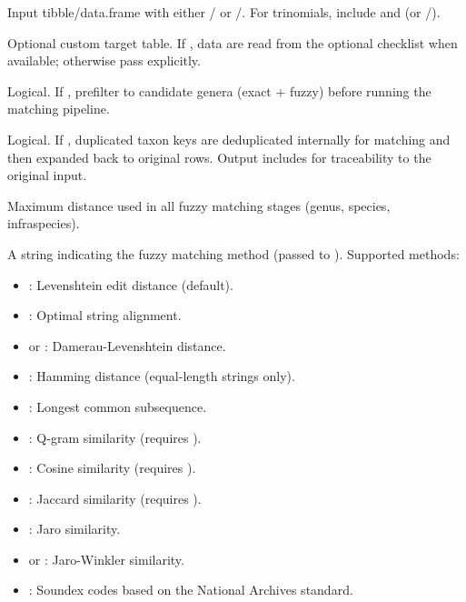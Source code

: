 \documentclass[a4paper]{book}
\begin{document}
%
\begin{Arguments}
\begin{ldescription}
\item[\code{df}] Input tibble/data.frame with either / or
/. For trinomials, include  and
 (or /).

\item[\code{target\_df}] Optional custom target table. If , data are read from
the optional  checklist when available; otherwise pass  explicitly.

\item[\code{prefilter\_genus}] Logical. If , prefilter  to candidate
genera (exact + fuzzy) before running the matching pipeline.

\item[\code{allow\_duplicates}] Logical. If , duplicated taxon keys are
deduplicated internally for matching and then expanded back to original
rows. Output includes  for traceability to the original input.

\item[\code{max\_dist}] Maximum distance used in all fuzzy matching stages (genus, species, infraspecies).

\item[\code{method}] A string indicating the fuzzy matching method (passed to ). Supported methods:
\begin{itemize}

\item{} : Levenshtein edit distance (default).
\item{} : Optimal string alignment.
\item{}  or : Damerau-Levenshtein distance.
\item{} : Hamming distance (equal-length strings only).
\item{} : Longest common subsequence.
\item{} : Q-gram similarity (requires ).
\item{} : Cosine similarity (requires ).
\item{} : Jaccard similarity (requires ).
\item{} : Jaro similarity.
\item{}  or : Jaro-Winkler similarity.
\item{} : Soundex codes based on the National Archives standard.


\end{itemize}
\end{ldescription}
\end{Arguments}
\end{document}
